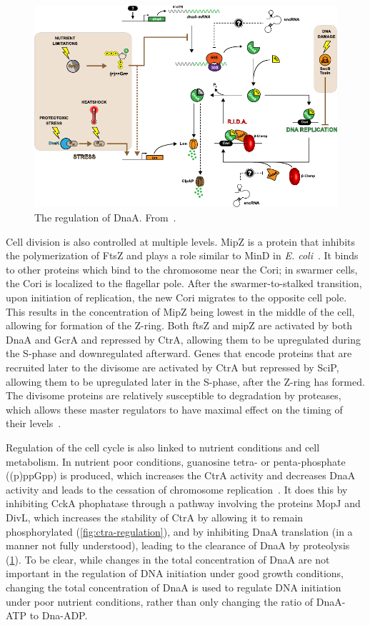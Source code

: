 \begin{figure}
    \centering
    \includegraphics{dnaa-regulation}
    \caption{
        The regulation of DnaA.
        From~\cite{frandi2019}.
        \label{fig:dnaa-regulation}
     }
\end{figure}

Cell division is also controlled at multiple levels.
MipZ is a protein that inhibits the polymerization of FtsZ and plays a role similar to MinD in \textit{E. coli}~\cite{collier2019}.
It binds to other proteins which bind to the chromosome near the Cori; in swarmer cells, the Cori is localized to the flagellar pole.
After the swarmer-to-stalked transition, upon initiation of replication, the new Cori migrates to the opposite cell pole.
This results in the concentration of MipZ being lowest in the middle of the cell, allowing for formation of the Z-ring.
Both ftsZ and mipZ are activated by both DnaA and GcrA and repressed by CtrA, allowing them to be upregulated during the S-phase and downregulated afterward.
Genes that encode proteins that are recruited later to the divisome are activated by CtrA but repressed by SciP, allowing them to be upregulated later in the S-phase, after the Z-ring has formed.
The divisome proteins are relatively susceptible to degradation by proteases, which allows these master regulators to have maximal effect on the timing of their levels~\cite{collier2019}.

Regulation of the cell cycle is also linked to nutrient conditions and cell metabolism.
In nutrient poor conditions, guanosine tetra- or penta-phosphate ((p)ppGpp) is produced, which increases the CtrA activity and decreases DnaA activity and leads to the cessation of chromosome replication~\cite{frandi2019}.
It does this by inhibiting CckA phophatase through a pathway involving the proteins MopJ and DivL, which increases the stability of CtrA by allowing it to remain phosphorylated (\cref{fig:ctra-regulation}), and by inhibiting DnaA translation (in a manner not fully understood), leading to the clearance of DnaA by proteolysis (\cref{fig:dnaa-regulation}).
To be clear, while changes in the total concentration of DnaA are not important in the regulation of DNA initiation under good growth conditions, changing the total concentration of DnaA is used to regulate DNA initiation under poor nutrient conditions, rather than only changing the ratio of DnaA-ATP to Dna-ADP.

